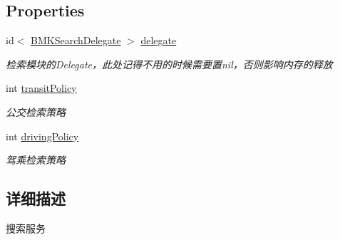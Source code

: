 \subsection*{Properties}
\begin{DoxyCompactItemize}
\item 
\hypertarget{interface_b_m_k_search_ad3b8fc2fe55c02166fb2a7953cdbc8d7}{id$<$ \hyperlink{protocol_b_m_k_search_delegate-p}{B\-M\-K\-Search\-Delegate} $>$ \hyperlink{interface_b_m_k_search_ad3b8fc2fe55c02166fb2a7953cdbc8d7}{delegate}}\label{interface_b_m_k_search_ad3b8fc2fe55c02166fb2a7953cdbc8d7}

\begin{DoxyCompactList}\small\item\em 检索模块的\-Delegate，此处记得不用的时候需要置nil，否则影响内存的释放 \end{DoxyCompactList}\item 
\hypertarget{interface_b_m_k_search_a070e0b90d93a92c1642e9390af7164ed}{int \hyperlink{interface_b_m_k_search_a070e0b90d93a92c1642e9390af7164ed}{transit\-Policy}}\label{interface_b_m_k_search_a070e0b90d93a92c1642e9390af7164ed}

\begin{DoxyCompactList}\small\item\em 公交检索策略 \end{DoxyCompactList}\item 
\hypertarget{interface_b_m_k_search_a7bbc7acb0020ab8d5d600ce423805606}{int \hyperlink{interface_b_m_k_search_a7bbc7acb0020ab8d5d600ce423805606}{driving\-Policy}}\label{interface_b_m_k_search_a7bbc7acb0020ab8d5d600ce423805606}

\begin{DoxyCompactList}\small\item\em 驾乘检索策略 \end{DoxyCompactList}\end{DoxyCompactItemize}


\subsection{详细描述}
搜索服务 

